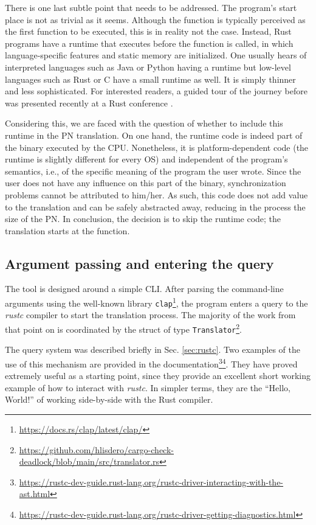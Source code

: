 There is one last subtle point that needs to be addressed.
The program's start place is not as trivial as it seems.
Although the  function is typically perceived
as the first function to be executed,
this is in reality not the case.
Instead, Rust programs have a runtime that executes
before the  function is called,
in which language-specific features and static memory are initialized.
One usually hears of interpreted languages such as Java or Python having a runtime
but low-level languages such as Rust or C have a small runtime as well.
It is simply thinner and less sophisticated.
For interested readers, a guided tour of the journey before 
was presented recently at a Rust conference \cite{levick2022}.

Considering this, we are faced with the question of
whether to include this runtime in the \acrshort{PN} translation.
On one hand, the runtime code is indeed part of the binary executed by the \acrshort{CPU}.
Nonetheless, it is platform-dependent code
(the runtime is slightly different for every \acrshort{OS})
and independent of the program's semantics,
i.e., of the specific meaning of the program the user wrote.
Since the user does not have any influence on this part of the binary,
synchronization problems cannot be attributed to him/her.
As such, this code does not add value to the translation
and can be safely abstracted away,
reducing in the process the size of the \acrshort{PN}.
In conclusion, the decision is to skip the runtime code;
the translation starts at the  function.

\subsection{Argument passing and entering the query}

The tool is designed around a simple \acrfull{CLI}.
After parsing the command-line arguments using the well-known
library \texttt{clap}\footnote{\url{https://docs.rs/clap/latest/clap/}},
the program enters a query to the \emph{rustc} compiler
to start the translation process.
The majority of the work from that point on is coordinated
by the struct of type \texttt{Translator}\footnote{\url{https://github.com/hlisdero/cargo-check-deadlock/blob/main/src/translator.rs}}.

The query system was described briefly in Sec. \ref{sec:rustc}.
Two examples of the use of this mechanism are provided in the
documentation\footnote{\url{https://rustc-dev-guide.rust-lang.org/rustc-driver-interacting-with-the-ast.html}}\footnote{\url{https://rustc-dev-guide.rust-lang.org/rustc-driver-getting-diagnostics.html}}.
They have proved extremely useful as a starting point,
since they provide an excellent short working example of
how to interact with \emph{rustc}.
In simpler terms, they are the ``Hello, World!''
of working side-by-side with the Rust compiler.

